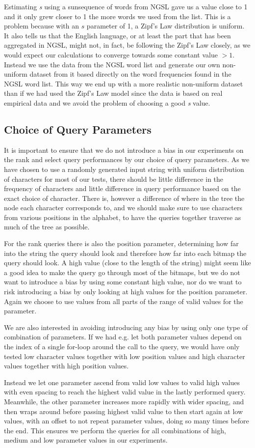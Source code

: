Estimating \textit{s} using a sunsequence of words from NGSL gave us a value close to 1 and it only grew closer to 1 the more words we used from the list.
This is a problem because with an $s$ parameter of 1, a Zipf's Law distribution is uniform.
It also tells us that the English language, or at least the part that has been aggregated in NGSL, might not, in fact, be following the Zipf's Law closely, as we would expect our calculations to converge towards some constant value $>1$.
Instead we use the data from the NGSL word list and generate our own non-uniform dataset from it based directly on the word frequencies found in the NGSL word list.
This way we end up with a more realistic non-uniform dataset than if we had used the Zipf's Law model since the data is based on real empirical data and we avoid the problem of choosing a good \textit{s} value.


\subsection{Choice of Query Parameters}
\label{sec:choiceOfQueryParameters}
It is important to ensure that we do not introduce a bias in our experiments on the rank and select query performances by our choice of query parameters.
As we have chosen to use a randomly generated input string with uniform distribution of characters for most of our tests, there should be little difference in the frequency of characters and little difference in query performance based on the exact choice of character.
There is, however a difference of where in the tree the node each character corresponds to, and we should make sure to use characters from various positions in the alphabet, to have the queries together traverse as much of the tree as possible.

For the rank queries there is also the position parameter, determining how far into the string the query should look and therefore how far into each bitmap the query should look.
A high value (close to the length of the string) might seem like a good idea to make the query go through most of the bitmaps, but we do not want to introduce a bias by using some constant high value, nor do we want to risk introducing a bias by only looking at high values for the position parameter.
Again we choose to use values from all parts of the range of valid values for the parameter.

We are also interested in avoiding introducing any bias by using only one type of combination of parameters.
If we had e.g. let both parameter values depend on the index of a single for-loop around the call to the query, we would have only tested low character values together with low position values and high character values together with high position values.

Instead we let one parameter ascend from valid low values to valid high values with even spacing to reach the highest valid value in the lastly performed query. Meanwhile, the other parameter increases more rapidly with wider spacing, and then wraps around before passing highest valid value to then start again at low values, with an offset to not repeat parameter values, doing so many times before the end.
This ensures we perform the queries for all combinations of high, medium and low parameter values in our experiments.
